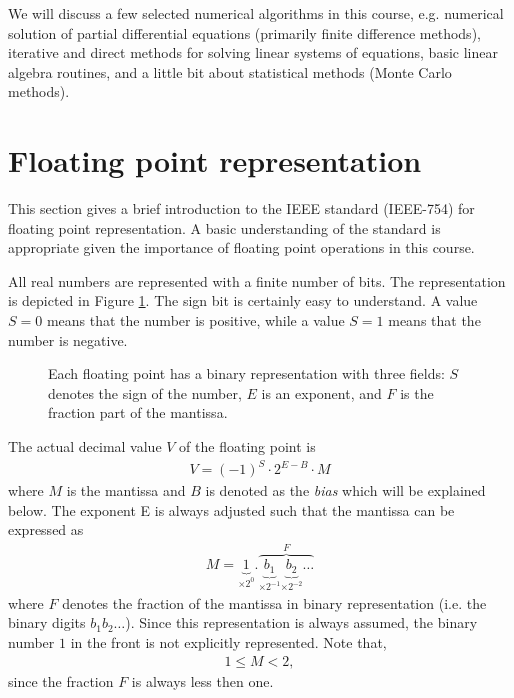 We will discuss a few selected numerical algorithms in this course, e.g.
numerical solution of partial differential equations (primarily finite
difference methods), iterative and direct methods for solving linear systems of
equations, basic linear algebra routines, and a little bit about statistical
methods (Monte Carlo methods).

\section{Floating point representation}

This section gives a brief introduction to the IEEE standard (IEEE-754) for
floating point representation. A basic understanding of the standard is
appropriate given the importance of floating point operations in this course.

All real numbers are represented with a finite number of bits. The
representation is depicted in Figure \ref{fig:fp}. The sign bit is certainly
easy to understand. A value $S=0$ means that the number is positive, while a
value $S=1$ means that the number is negative.

\begin{figure}
  \centering
  \caption{
    Each floating point has a binary representation with three fields: $S$
    denotes the sign of the number, $E$ is an exponent, and $F$ is the fraction
    part of the mantissa.
  }
  \label{fig:fp}
\end{figure}

The actual decimal value $V$ of the floating point is
\begin{align}
  V = (-1)^S \cdot 2^{E-B}\cdot M
\end{align}
where $M$ is the mantissa and $B$ is denoted as the \emph{bias} which will be
explained below. The exponent E is always adjusted such that the mantissa can be
expressed as
\begin{align}
  M = \underbrace{1}_{\times2^0} .
  \overbrace{\underbrace{b_1}_{\times2^{-1}}
  \underbrace{b_2}_{\times2^{-2}}\ldots}^{F}
\end{align}
where $F$ denotes the fraction of the mantissa in binary representation (i.e.
the binary digits $b_1b_2\ldots$). Since this representation is always assumed,
the binary number $1$ in the front is not explicitly represented. Note that,
\begin{align}
  1 \leq M < 2,
\end{align}
since the fraction $F$ is always less then one.

